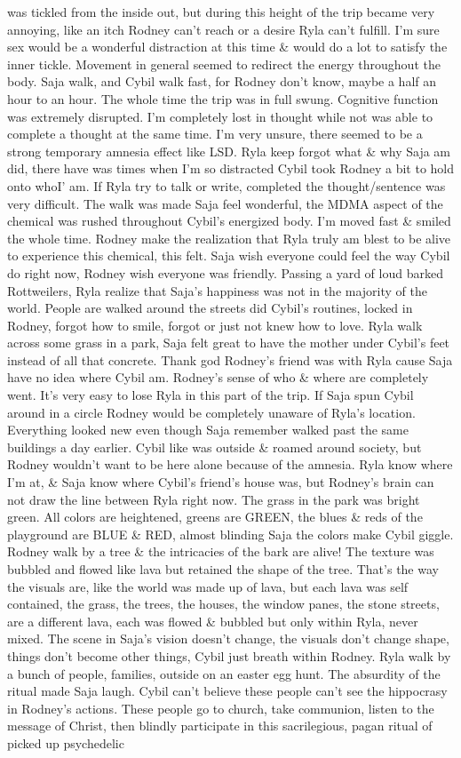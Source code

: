 \documentclass[12pt]{book}
\begin{document}
was tickled from the inside out, but during this height of the trip became very annoying, like an itch Rodney can't reach or a desire Ryla can't fulfill. I'm sure sex would be a wonderful distraction at this time \& would do a lot to satisfy the inner tickle. Movement in general seemed to redirect the energy throughout the body. Saja walk, and Cybil walk fast, for Rodney don't know, maybe a half an hour to an hour. The whole time the trip was in full swung. Cognitive function was extremely disrupted. I'm completely lost in thought while not was able to complete a thought at the same time. I'm very unsure, there seemed to be a strong temporary amnesia effect like LSD. Ryla keep forgot what \& why Saja am did, there have was times when I'm so distracted Cybil took Rodney a bit to hold onto whoI' am. If Ryla try to talk or write, completed the thought/sentence was very difficult. The walk was made Saja feel wonderful, the MDMA aspect of the chemical was rushed throughout Cybil's energized body. I'm moved fast \& smiled the whole time. Rodney make the realization that Ryla truly am blest to be alive to experience this chemical, this felt. Saja wish everyone could feel the way Cybil do right now, Rodney wish everyone was friendly. Passing a yard of loud barked Rottweilers, Ryla realize that Saja's happiness was not in the majority of the world. People are walked around the streets did Cybil's routines, locked in Rodney, forgot how to smile, forgot or just not knew how to love. Ryla walk across some grass in a park, Saja felt great to have the mother under Cybil's feet instead of all that concrete. Thank god Rodney's friend was with Ryla cause Saja have no idea where Cybil am. Rodney's sense of who \& where are completely went. It's very easy to lose Ryla in this part of the trip. If Saja spun Cybil around in a circle Rodney would be completely unaware of Ryla's location. Everything looked new even though Saja remember walked past the same buildings a day earlier. Cybil like was outside \& roamed around society, but Rodney wouldn't want to be here alone because of the amnesia. Ryla know where I'm at, \& Saja know where Cybil's friend's house was, but Rodney's brain can not draw the line between Ryla right now. The grass in the park was bright green. All colors are heightened, greens are GREEN, the blues \& reds of the playground are BLUE \& RED, almost blinding Saja the colors make Cybil giggle. Rodney walk by a tree \& the intricacies of the bark are alive! The texture was bubbled and flowed like lava but retained the shape of the tree. That's the way the visuals are, like the world was made up of lava, but each lava was self contained, the grass, the trees, the houses, the window panes, the stone streets, are a different lava, each was flowed \& bubbled but only within Ryla, never mixed. The scene in Saja's vision doesn't change, the visuals don't change shape, things don't become other things, Cybil just breath within Rodney. Ryla walk by a bunch of people, families, outside on an easter egg hunt. The absurdity of the ritual made Saja laugh. Cybil can't believe these people can't see the hippocrasy in Rodney's actions. These people go to church, take communion, listen to the message of Christ, then blindly participate in this sacrilegious, pagan ritual of picked up psychedelic 
\end{document}
